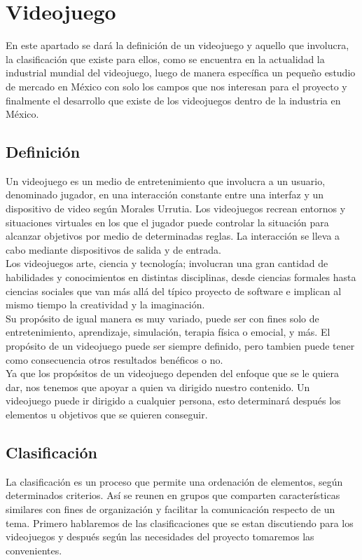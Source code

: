 \section{Videojuego}
En este apartado se dará la definición de un videojuego y aquello que involucra, la clasificación que existe para ellos, como se encuentra en la actualidad la industrial mundial del videojuego, luego de manera específica un pequeño estudio de mercado en México con solo los campos que nos interesan para el proyecto y finalmente el desarrollo que existe de los videojuegos dentro de la industria en México. 

\subsection{Definición}
Un videojuego es un medio de entretenimiento que involucra a un usuario, denominado jugador, en una interacción constante entre una interfaz y un dispositivo de video según Morales Urrutia\cite{defVid}. Los videojuegos recrean	entornos y situaciones virtuales en los que el jugador puede controlar la situación para alcanzar objetivos por medio de determinadas reglas. La interacción se lleva a cabo mediante dispositivos de salida y de entrada.
\\[1pt]
		
Los videojuegos arte, ciencia y tecnología; involucran una gran cantidad de habilidades y conocimientos en distintas disciplinas, desde ciencias formales hasta ciencias sociales que van más allá del típico proyecto de software e implican al mismo tiempo la creatividad y la imaginación.
\\[1pt]

Su propósito de igual manera es muy variado, puede ser con fines solo de entretenimiento, aprendizaje, simulación, terapia física o emocial, y más. El propósito de un videojuego puede ser siempre definido, pero tambien puede tener como consecuencia otros resultados benéficos o no.
\\[1pt]

Ya que los propósitos de un videojuego dependen del enfoque que se le quiera dar, nos tenemos que apoyar a quien va dirigido nuestro contenido. Un videojuego puede ir dirigido a cualquier persona, esto determinará después los elementos u objetivos que se quieren conseguir.
\\[1pt]  
					
\subsection{Clasificación}
La clasificación es un proceso que permite una ordenación de elementos, según determinados criterios. Así se reunen en grupos que comparten características similares con fines de organización y facilitar la comunicación respecto de un tema. Primero hablaremos de las clasificaciones que se estan discutiendo para los videojuegos y después según las necesidades del proyecto tomaremos las convenientes. 
\\[1pt]

